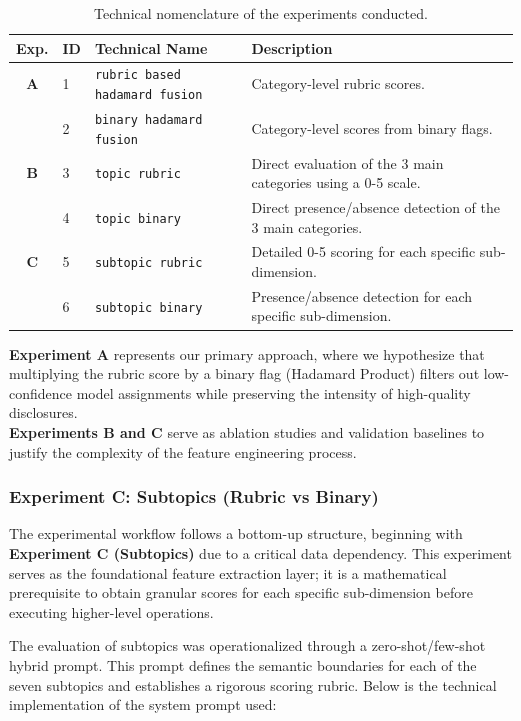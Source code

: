 \begin{table}[htbp]
\centering
\caption{Technical nomenclature of the experiments conducted.}
\label{tab:experiment_names}
\begin{tabular}{@{}cllp{5cm}@{}}
\toprule
\textbf{Exp.} & \textbf{ID} & \textbf{Technical Name} & \textbf{Description} \\ \midrule
\textbf{A} & 1 & \texttt{rubric based hadamard fusion} & Category-level rubric scores. \\
           & 2 & \texttt{binary hadamard fusion} & Category-level scores from binary flags. \\ \midrule
\textbf{B} & 3 & \texttt{topic rubric} & Direct evaluation of the 3 main categories using a 0-5 scale. \\
           & 4 & \texttt{topic binary} & Direct presence/absence detection of the 3 main categories. \\ \midrule
\textbf{C} & 5 & \texttt{subtopic rubric} & Detailed 0-5 scoring for each specific sub-dimension. \\
           & 6 & \texttt{subtopic binary} & Presence/absence detection for each specific sub-dimension. \\ \bottomrule
\end{tabular}
\end{table}



\textbf{Experiment A} represents our primary approach, where we hypothesize that multiplying the rubric score by a binary flag (Hadamard Product) filters out low-confidence model assignments while preserving the intensity of high-quality disclosures.\\
\textbf{Experiments B and C} serve as ablation studies and validation baselines to justify the complexity of the feature engineering process.


        \subsubsection{Experiment C: Subtopics (Rubric vs Binary)}
The experimental workflow follows a bottom-up structure, beginning with \textbf{Experiment C (Subtopics)} due to a critical data dependency. This experiment serves as the foundational feature extraction layer; it is a mathematical prerequisite to obtain granular scores for each specific sub-dimension before executing higher-level operations.

The evaluation of subtopics was operationalized through a zero-shot/few-shot hybrid prompt. This prompt defines the semantic boundaries for each of the seven subtopics and establishes a rigorous scoring rubric. Below is the technical implementation of the system prompt used:

